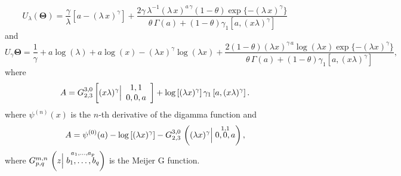 \documentclass[12pt,a4paper]{article} %
\begin{document}
\begin{equation*}
U_{\lambda}(\boldsymbol{\Theta})=\frac{\gamma }{\lambda }\left[a-(\lambda\,x)^\gamma\right]+\frac{2 \gamma \,\lambda^{-1}(\lambda\,x)^{a\,\gamma} (1-\theta )\exp\{-(\lambda\,x)^\gamma\} }{\theta \,\Gamma(a)+(1-\theta )
   \gamma_1 \left[a,(x \lambda )^{\gamma }\right]}
\end{equation*}
and
\begin{equation*}		
U_{\gamma}\boldsymbol{\Theta}=\frac{1}{\gamma }+a \log (\lambda )+a \log (x)-(\lambda  x)^{\gamma } \log
   (\lambda  x)+\frac{2 (1-\theta )(\lambda 
   x)^{\gamma\,a } \log (\lambda  x)\exp\{-(\lambda  x)^{\gamma }\}  }{\theta \,\Gamma(a)+(1-\theta )
   \gamma_1 \left[a,(x \lambda )^{\gamma }\right]},
\end{equation*}
where
\begin{align*}
A=G_{2,3}^{3,0}\left[(x \lambda )^{\gamma }\Big{|}
\begin{array}{c}
 1,1 \\
 0,0,a \\
\end{array}
\right]+\log \left[(\lambda  x)^{\gamma }\right] \gamma_1 \left[a,(x \lambda )^{\gamma
   }\right].
\end{align*}
where $\psi^{(n)}(x)$ is the $n$-th derivative of the digamma function and
\begin{eqnarray*}
A=\psi^{(0)}(a) - \log\left[(\lambda x)^{\gamma}\right]-G^{3,0}_{2,3}\,\left((\lambda x)^{\gamma} \Big{|}	\stackrel{1,1}{0,0,a}\right),
\end{eqnarray*}
where $G^{m,n}_{p,q}\,\left(z \Big{|}	\stackrel{a_{1},\ldots,a_{p}}{b_{1},\ldots,b_{q}}\right)$ is the Meijer G function.%




\end{document}
